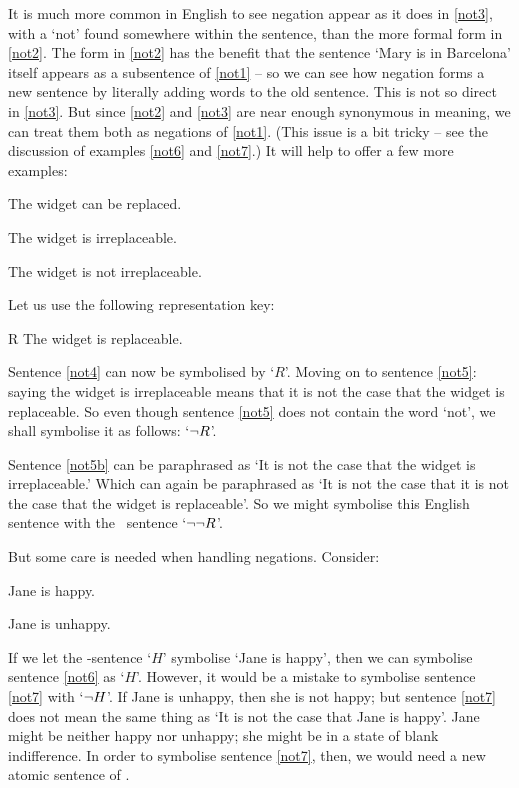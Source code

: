 It is much more common in English to see negation appear as it does in \ref{not3}, with a `not' found somewhere within the sentence, than the more formal form in \ref{not2}. The form in \ref{not2} has the benefit that the sentence `Mary is in Barcelona' itself appears as a subsentence of \ref{not1} – so we can see how negation forms a new sentence by literally adding words to the old sentence. This is not so direct in \ref{not3}. But since \ref{not2} and \ref{not3} are near enough synonymous in meaning, we can treat them both as negations of \ref{not1}. (This issue is a bit tricky – see the discussion of examples \ref{not6} and \ref{not7}.)
It will help to offer a few more examples:
	\begin{earg}
		\item[\ex{not4}] The widget can be replaced.
		\item[\ex{not5}] The widget is irreplaceable.
		\item[\ex{not5b}] The widget is not irreplaceable.
	\end{earg}
Let us use the following representation key:
	\begin{ekey}
		\item[R] The widget is replaceable.
	\end{ekey}
Sentence \ref{not4} can now be symbolised by `$R$'. Moving on to sentence \ref{not5}: saying the widget is irreplaceable means that it is not the case that the widget is replaceable. So even though sentence \ref{not5} does not contain the word `not', we shall symbolise it as follows: `$\neg R$'.

Sentence \ref{not5b} can be paraphrased as `It is not the case that the widget is irreplaceable.' Which can again be paraphrased as `It is not the case that it is not the case that the widget is replaceable'. So we might symbolise this English sentence with the \TFL\ sentence `$\neg\neg R$'. %

But some care is needed when handling negations. Consider:
	\begin{earg}
		\item[\ex{not6}] Jane is happy.
		\item[\ex{not7}] Jane is unhappy.
	\end{earg}
If we let the \TFL-sentence `$H$' symbolise  `Jane is happy', then we can symbolise sentence \ref{not6} as `$H$'. However, it would be a mistake to symbolise sentence \ref{not7} with `$\neg{H}$'. If Jane is unhappy, then she is not happy; but sentence \ref{not7} does not mean the same thing as `It is not the case that Jane is happy'. Jane might be neither happy nor unhappy; she might be in a state of blank indifference. In order to symbolise sentence \ref{not7}, then, we would need a new atomic sentence of \TFL.

